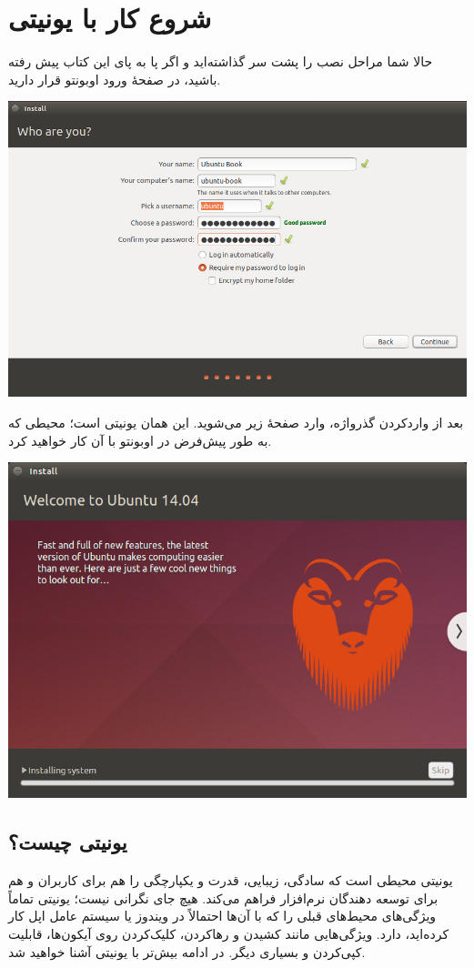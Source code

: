 \chapter{شروع کار با یونیتی}
حالا شما مراحل نصب را پشت سر گذاشته‌اید و اگر پا به پای این کتاب پیش رفته باشید، در صفحهٔ ورود اوبونتو قرار دارید.
\begin{center}
\includegraphics[scale=0.4]{pics/11.png}
\end{center}

بعد از واردکردن گذرواژه، وارد صفحهٔ زیر می‌شوید. این همان یونیتی است؛ محیطی که به طور پیش‌فرض در اوبونتو با آن کار خواهید کرد.
\begin{center}
\includegraphics[scale=0.4]{pics/12.png}
\end{center}

\section{یونیتی چیست؟}
یونیتی محیطی است که سادگی، زیبایی، قدرت و یکپارچگی را هم برای کاربران و هم برای توسعه دهندگان نرم‌افزار فراهم می‌کند.
هیچ جای نگرانی نیست؛ یونیتی تماماً ویژگی‌های محیط‌های قبلی را که با آن‌ها احتمالاً در ویندوز یا سیستم عامل اپل کار کرده‌اید، دارد. ویژگی‌هایی مانند کشیدن و رهاکردن، کلیک‌کردن روی آیکون‌ها، قابلیت کپی‌کردن و بسیاری دیگر.
در ادامه بیش‌تر با یونیتی آشنا خواهید شد.
